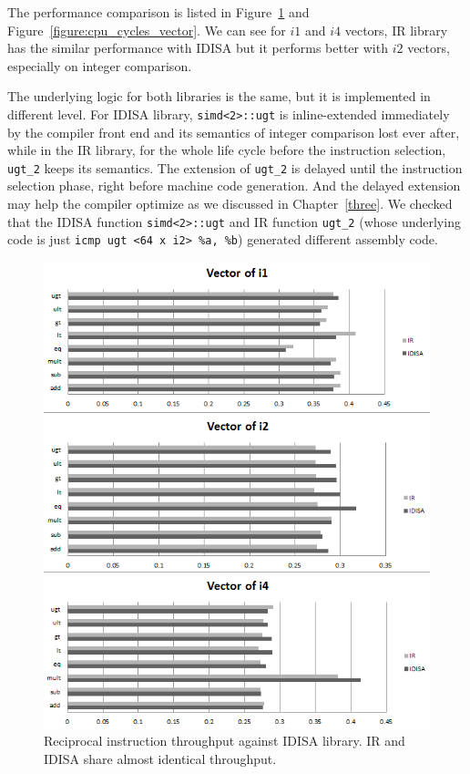 The performance comparison is listed in Figure~\ref{figure:throughput_vector} and Figure~\ref{figure:cpu_cycles_vector}. We can see for $i1$ and $i4$ vectors, IR library has the similar performance with IDISA but it performs better with $i2$ vectors, especially on integer comparison.

The underlying logic for both libraries is the same, but it is implemented in different level. For IDISA library, {\tt simd<2>::ugt} is inline-extended immediately by the compiler front end and its semantics of integer comparison lost ever after, while in the IR library, for the whole life cycle before the instruction selection, {\tt ugt\_2} keeps its semantics. The extension of {\tt ugt\_2} is delayed until the instruction selection phase, right before machine code generation. And the delayed extension may help the compiler optimize as we discussed in Chapter~\ref{three}. We checked that the IDISA function {\tt simd<2>::ugt} and IR function {\tt ugt\_2} (whose underlying code is just \verb|icmp ugt <64 x i2> %a, %b|) generated different assembly code.

\begin{figure}[htbp!]
\centering
\includegraphics[width=140mm]{draw/reciprocal_throughput_vector.png}
\caption[Reciprocal instruction throughput against IDISA library]{Reciprocal instruction throughput against IDISA library. IR and IDISA share almost identical throughput.}
\label{figure:throughput_vector}
\end{figure}

